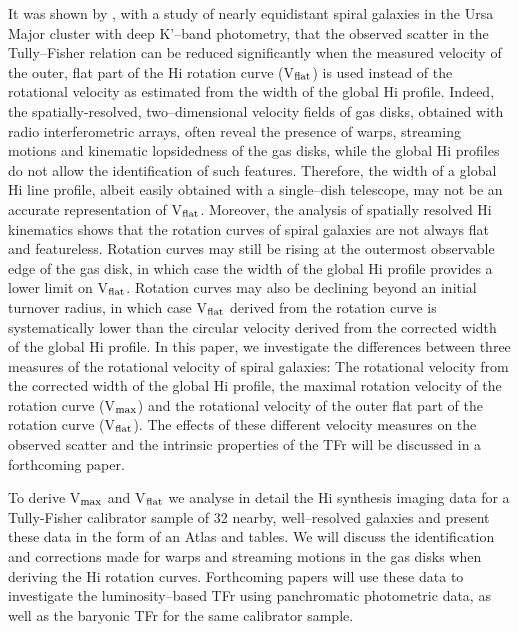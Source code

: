 \documentclass[usenatbib,useAMS]{mnras}
\begin{document}
It was shown by \citet{v01}, with a study of nearly equidistant spiral
galaxies in the Ursa Major cluster with deep K'--band photometry, that
the observed scatter in the Tully--Fisher relation can be reduced
significantly when the measured velocity of the outer, flat part of
the H{\sc i} rotation curve (V$_{\rm flat}$) is used instead of the
rotational velocity as estimated from the width of the global H{\sc i}
profile.  Indeed, the spatially-resolved, two--dimensional velocity
fields of gas disks, obtained with radio interferometric arrays, often
reveal the presence of warps, streaming motions and kinematic
lopsidedness of the gas disks, while the global H{\sc i} profiles do not
allow the identification of such features.  Therefore, the width of a
global H{\sc i} line profile, albeit easily obtained with a single--dish
telescope, may not be an accurate representation of V$_{\rm flat}$. 
Moreover, the analysis of spatially resolved H{\sc i} kinematics shows
that the rotation curves of spiral galaxies are not always flat and
featureless. Rotation curves may still be rising at the outermost
observable edge of the gas disk, in which case the width of the global
H{\sc i} profile provides a lower limit on V$_{\rm flat}$.  Rotation
curves may also be declining beyond an initial turnover radius, in which
case V$_{\rm flat}$ derived from the rotation curve is systematically
lower than the circular velocity derived from the corrected width of the
global H{\sc i} profile.  In this paper, we investigate the
differences between three measures of the rotational velocity of spiral
galaxies: The rotational velocity from the corrected width of the global
H{\sc i} profile, the maximal rotation velocity of the rotation curve
(V$_{\rm max}$) and the rotational velocity of the outer flat part of
the rotation curve (V$_{\rm flat}$).  The effects of these different
velocity measures on the observed scatter and the intrinsic properties
of the TFr will be discussed in a forthcoming paper.

To derive V$_{\rm max}$ and V$_{\rm flat}$ we analyse in detail the
H{\sc i} synthesis imaging data for a Tully-Fisher calibrator sample of
32 nearby, well--resolved galaxies and present these data in the form
of an Atlas and tables.  We will discuss the identification and
corrections made for warps and streaming motions in the gas disks when
deriving the H{\sc i} rotation curves.  Forthcoming papers will use
these data to investigate the luminosity--based TFr using panchromatic
photometric data, as well as the baryonic TFr for the same calibrator
sample. 
\end{document}
